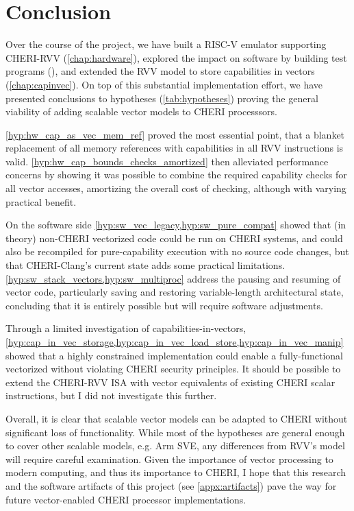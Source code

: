 \documentclass[../thesis]{subfiles}
\begin{document}
\chapter{Conclusion}

Over the course of the project, we have built a RISC-V emulator supporting CHERI-RVV (\cref{chap:hardware}), explored the impact on software by building test programs (), and extended the RVV model to store capabilities in vectors (\cref{chap:capinvec}).
On top of this substantial implementation effort, we have presented conclusions to hypotheses (\cref{tab:hypotheses}) proving the general viability of adding scalable vector models to CHERI processsors.

\cref{hyp:hw_cap_as_vec_mem_ref} proved the most essential point, that a blanket replacement of all memory references with capabilities in all RVV instructions is valid.
\cref{hyp:hw_cap_bounds_checks_amortized} then alleviated performance concerns by showing it was possible to combine the required capability checks for all vector accesses, amortizing the overall cost of checking, although with varying practical benefit.

On the software side \cref{hyp:sw_vec_legacy,hyp:sw_pure_compat} showed that (in theory) non-CHERI vectorized code could be run on CHERI systems, and could also be recompiled for pure-capability execution with no source code changes, but that CHERI-Clang's current state adds some practical limitations.
\cref{hyp:sw_stack_vectors,hyp:sw_multiproc} address the pausing and resuming of vector code, particularly saving and restoring variable-length architectural state, concluding that it is entirely possible but will require software adjustments.

Through a limited investigation of capabilities-in-vectors, \cref{hyp:cap_in_vec_storage,hyp:cap_in_vec_load_store,hyp:cap_in_vec_manip} showed that a highly constrained implementation could enable a fully-functional vectorized  without violating CHERI security principles.
It should be possible to extend the CHERI-RVV ISA with vector equivalents of existing CHERI scalar instructions, but I did not investigate this further.

Overall, it is clear that scalable vector models can be adapted to CHERI without significant loss of functionality.
While most of the hypotheses are general enough to cover other scalable models, e.g. Arm SVE, any differences from RVV's model will require careful examination.
Given the importance of vector processing to modern computing, and thus its importance to CHERI, I hope that this research and the software artifacts of this project (see \cref{appx:artifacts}) pave the way for future vector-enabled CHERI processor implementations.

\end{document}
